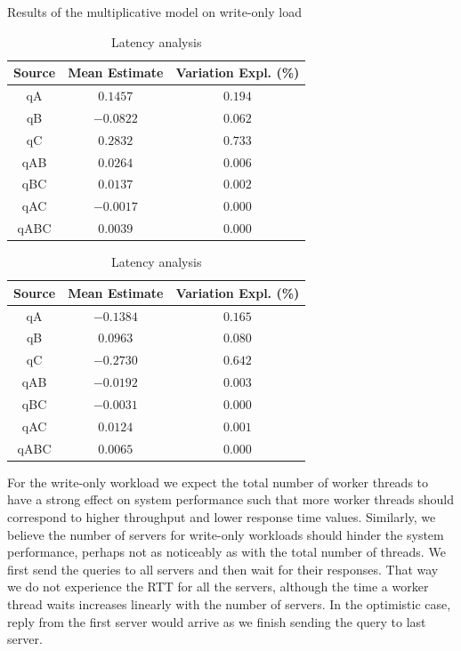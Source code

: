 \documentclass[11pt,a4paper]{article}
\begin{document}
\begin{table}[h]
\centering
\small
{Results of the multiplicative model on write-only load}
\begin{minipage}{.5\textwidth}
\centering
	\begin{tabular}{|c|c|c|}
	\hline 
	{\small Source} & {\small Mean Estimate} & {\small Variation Expl. (\%)} \\ 
	\hline 
	qA & $0.1457$ & $0.194$ \\ 
	\hline 
	qB & $-0.0822$ & $0.062$ \\ 
	\hline 
	qC & $0.2832$ & $0.733$ \\ 
	\hline 
	qAB & $0.0264$ & $0.006$ \\ 
	\hline 
	qBC & $0.0137$ & $0.002$ \\ 
	\hline 
	qAC & $-0.0017$ & $0.000$ \\ 
	\hline 
	qABC & $0.0039$ & $0.000$ \\ 
	\hline 
	\end{tabular} \caption{Throughput analysis} \label{tab:2k-mult-wo-tpt}
\end{minipage}%
\begin{minipage}{.5\textwidth}
\centering
	\begin{tabular}{|c|c|c|}
	\hline 
	{\small Source} & {\small Mean Estimate} & {\small Variation Expl. (\%)} \\ 
	\hline 
	qA & $-0.1384$ & $0.165$ \\ 
	\hline 
	qB & $0.0963$ & $0.080$ \\ 
	\hline 
	qC & $-0.2730$ & $0.642$ \\ 
	\hline 
	qAB & $-0.0192$ & $0.003$ \\ 
	\hline 
	qBC & $-0.0031$ & $0.000$ \\ 
	\hline 
	qAC & $0.0124$ & $0.001$ \\ 
	\hline 
	qABC & $0.0065$ & $0.000$ \\ 
	\hline 
	\end{tabular} \caption{Latency analysis} \label{tab:2k-mult-wo-lat}
\end{minipage}
\end{table}\label{tab:2k-mult-wo}
\par For the write-only workload we expect the total number of worker threads to have a strong effect on system performance such that more worker threads should correspond to higher throughput and lower response time values. Similarly, we believe the number of servers for write-only workloads should hinder the system performance, perhaps not as noticeably as with the total number of threads. We first send the queries to all servers and then wait for their responses. That way we do not experience the RTT for all the servers, although the time a worker thread waits increases linearly with the number of servers. In the optimistic case, reply from the first server would arrive as we finish sending the query to last server.
\end{document}
